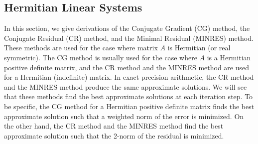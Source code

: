 \subsection{{Hermitian Linear Systems}}\label{sec:hermitian-linear-systems}
{In this section, we give derivations of the Conjugate Gradient (CG) method, the Conjugate Residual (CR) method, and the Minimal Residual (MINRES) method. These methods are used for the case where matrix $A$ is Hermitian (or real symmetric). The CG method is usually used for the case where $A$ is a Hermitian positive definite matrix, and the CR method and the MINRES method are used for a Hermitian (indefinite) matrix. In exact precision arithmetic, the CR method and the MINRES method produce the same approximate solutions. We will see that these methods find the best approximate solutions at each iteration step. To be specific, the CG method for a Hermitian positive definite matrix finds the best approximate solution such that a weighted norm of the error is minimized. On the other hand, the CR method and the MINRES method find the best approximate solution such that the 2-norm of the residual is minimized.}
